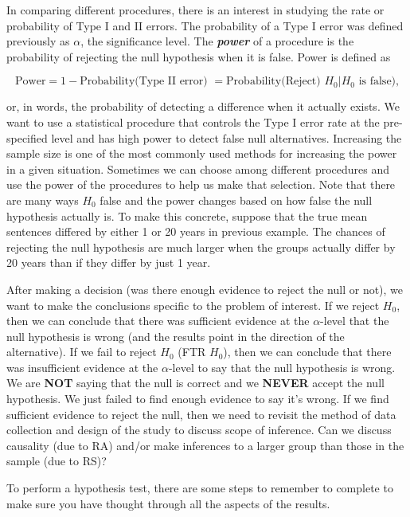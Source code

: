 \documentclass[]{book}
\theoremstyle{definition}
\theoremstyle{definition}
\theoremstyle{remark}
\begin{document}
In comparing different procedures, there is an interest in studying the
rate or probability of Type I and II errors. The probability of a Type I
error was defined previously as \(\alpha\), the significance level. The
\textbf{\emph{power}} of a procedure is the probability of rejecting the
null hypothesis when it is false. Power is defined as

\[\text{Power} = 1 - \text{Probability(Type II error) } = 
\text{Probability(Reject) } H_0 | H_0 \text{ is false),}\]

or, in words, the probability of detecting a difference when it actually
exists. We want to use a statistical procedure that controls the Type I
error rate at the pre-specified level and has high power to detect false
null alternatives. Increasing the sample size is one of the most
commonly used methods for increasing the power in a given situation.
Sometimes we can choose among different procedures and use the power of
the procedures to help us make that selection. Note that there are many
ways \(H_0\) false and the power changes based on how false the null
hypothesis actually is. To make this concrete, suppose that the true
mean sentences differed by either 1 or 20 years in previous example. The
chances of rejecting the null hypothesis are much larger when the groups
actually differ by 20 years than if they differ by just 1 year.

After making a decision (was there enough evidence to reject the null or
not), we want to make the conclusions specific to the problem of
interest. If we reject \(H_0\), then we can conclude that there was
sufficient evidence at the \(\alpha\)-level that the null hypothesis is
wrong (and the results point in the direction of the alternative). If we
fail to reject \(H_0\) (FTR \(H_0\)), then we can conclude that there
was insufficient evidence at the \(\alpha\)-level to say that the null
hypothesis is wrong. We are \textbf{NOT} saying that the null is correct
and we \textbf{NEVER} accept the null hypothesis. We just failed to find
enough evidence to say it's wrong. If we find sufficient evidence to
reject the null, then we need to revisit the method of data collection
and design of the study to discuss scope of inference. Can we discuss
causality (due to RA) and/or make inferences to a larger group than
those in the sample (due to RS)?

To perform a hypothesis test, there are some steps to remember to
complete to make sure you have thought through all the aspects of the
results.
\end{document}
